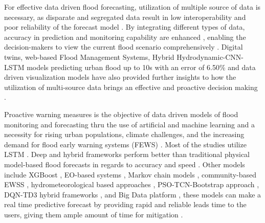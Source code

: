 \documentclass{research}
\begin{document}
For effective data driven flood forecasting, utilization of multiple source of data is necessary, as disparate and segregated data result in 
low interoperability and poor reliability of the forecast model \cite{Istihat_Widyarto_Ahmad}\cite{TEDLA2024131076}
\cite{Fang_Johnson_Sankarasubramanian_2024}\cite{Quang_Van_Thanh_2025}\cite{smartcities8030091}\cite{w14142160}\cite{H_Rao_Rao_J_Rao_Rao_2023}
\cite{nazari2026}\cite{cli12050067}\cite{byaruhanga2024evolution}. By integrating different types of data, accuracy in prediction and 
monitoring capability are enhanced \cite{Wang_Abdelrahman_2023}\cite{ZHU2025134074}\cite{XU2025134243}, enabling the decision-makers to view 
the current flood scenario comprehensively \cite{song2024stateart}\cite{reinert_2025}\cite{Fan_Zeng_Pang_Wang_Wei_2025}\cite{11089725}
\cite{FloodNet_2024}\cite{w15010178}\cite{Ragib2025}. Digital twins, web-based Flood Management Systems, Hybrid Hydrodynamic-CNN-LSTM models 
predicting urban flood up to 10s with an error of 6.50\% and data driven visualization models have also provided further insights to how the 
utilization of multi-source data brings an effective and proactive decision making \cite{rs17173104}\cite{MCRAPALO2024131929}
\cite{Basari_Alazzam_Abdirahim_Lah_Ahmad_Mustapha_2026}\cite{DANG2025106246}\cite{w15071397}\cite{LIU2025101960}
\cite{Akinsoji_Adelodun_Adeyi_Salau_Odey_Choi_2024}\cite{DiBacco_Molinari_Scorzini_2024}\cite{Hofmeistetal_2024}.

Proactive warning measures is the objective of data driven models of flood monitoring and forecasting
thru the use of artificial and machine learning \cite{alrawas2024critical}\cite{piadeh2022critical}
\cite{Fang_Johnson_Sankarasubramanian_2024}\cite{demelo2024early}\cite{zlopasa2024leveraging} and a necessity for rising urban populations, 
climate challenges, and the increasing demand for flood early warning systems (FEWS) \cite{fernandeznovoa2024enhancing}
\cite{hossoda2025datadriven}\cite{oddo2024deep}\cite{hofmann2020risk}\cite{lee2020integrated}\cite{soares2025ml4ff}. Most of the studies 
utilize LSTM \cite{kuhaneswaran2025evolution}\cite{nevo2022flood}\cite{khan2025development}
\cite{aravamudan2025superresolution}. Deep and hybrid frameworks perform better than traditional physical model-based flood forecasts in 
regards to accuracy and speed \cite{li2024optimizing}\cite{refadah2025development}\cite{situ2024improving}\cite{yi2024reservoir}. 
Other models include XGBoost \cite{sanders2022datadriven}, EO-based systems \cite{destefanis2025advancing}, Markov chain models 
\cite{bibbo2025flood}, community-based EWSS \cite{cheong2024development}, hydrometeorological based approaches \cite{troselj2023realtime}, 
PSO-TCN-Bootstrap approach \cite{yu2025research}, DQN-TD3 hybrid frameworks \cite{rashid2024realtime}, and Big Data platform 
\cite{hou2025development}, these models can make a real time predictive forecast by providing rapid and reliable leads time to the users, 
giving them ample amount of time for mitigation \cite{lee2023maxfloodcast}\cite{alasali2021sustainable}\cite{najafi2024high}.
\end{document}
